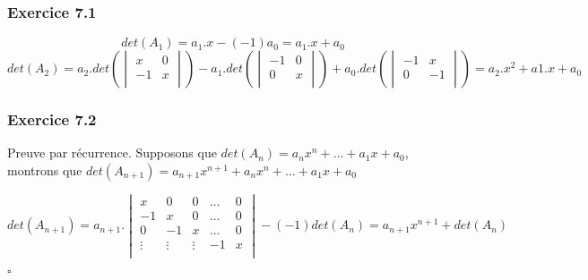 \documentclass[]{book}
\theoremstyle{definition}
\begin{document}
\subsubsection*{Exercice 7.1}
$$det(A_1) = a_1.x - (-1)a_0 = a_1.x + a_0$$
$$det(A_2) = a_2.det\left( \begin{vmatrix} x & 0 \\ -1 & x \\ \end{vmatrix} \right) - a_1.det\left( \begin{vmatrix} -1 & 0 \\ 0 & x \\ \end{vmatrix}\right) + a_0.det\left( \begin{vmatrix} -1 & x \\ 0 & -1 \\ \end{vmatrix}\right) = a_2.x^2 + a1.x + a_0$$

\subsubsection*{Exercice 7.2}
Preuve par r\'ecurrence. Supposons que $det(A_n) = a_nx^n+ \ldots + a_1x + a_0$, montrons que $det(A_{n+1}) = a_{n+1}x^{n+1} +  a_nx^n+ \ldots + a_1x + a_0$ 

$$det(A_{n+1}) = a_{n+1}.\begin{vmatrix} x & 0 & 0 & \ldots & 0 \\ -1 & x & 0 & \ldots & 0 \\ 0 & -1 & x & \ldots & 0 \\ \vdots & \vdots & \vdots & -1 & x \\ \end{vmatrix} -(-1)det(A_n) = a_{n+1}x^{n+1} + det(A_n)$$


$\square$
\end{document}
